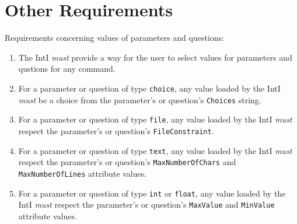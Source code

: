 \documentclass[11pt]{article}
\newcommand{\must}{{\it must}}
\newcounter{coreReq}
\begin{document}
\section{Other Requirements}

\noindent Requirements concerning values of parameters and questions:
\begin{enumerate}
\setcounter{enumi}{\value{coreReq}}

\item The IntI {\must} provide a way for the user to select values for
  parameters and qustions for any command.

\item For a parameter or question of type {\tt choice}, any value loaded
  by the IntI {\must} be a choice from the parameter's or question's
  {\tt Choices} string.

\item For a parameter or question of type {\tt file}, any value loaded by
  the IntI {\must} respect the parameter's or question's {\tt FileConstraint}.

\item For a parameter or question of type {\tt text}, any value loaded by
  the IntI {\must} respect the parameter's or question's
  {\tt MaxNumberOfChars} and {\tt MaxNumberOfLines} attribute values.

\item For a parameter or question of type {\tt int} or {\tt float}, any
  value loaded by the IntI {\must} respect the parameter's or question's
  {\tt MaxValue} and {\tt MinValue} attribute values.

\setcounter{coreReq}{\value{enumi}}
\end{enumerate}
\end{document}
